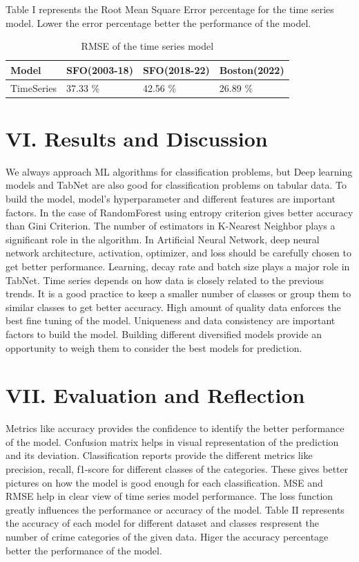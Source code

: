 \documentclass[10 pt,conference,final,]{IEEEtran}
\begin{document}
Table I represents the Root Mean Square Error percentage for the time
series model. Lower the error percentage better the performance of the
model.

\begin{table}
\centering
\caption{\label{tab:unnamed-chunk-16}RMSE of the time series model}
\centering
\begin{tabular}[t]{l|l|l|l}
\hline
Model & SFO(2003-18) & SFO(2018-22) & Boston(2022)\\
\hline
TimeSeries & 37.33 \% & 42.56 \% & 26.89 \%\\
\hline
\end{tabular}
\end{table}

\section{VI. Results and Discussion}\label{vi.-results-and-discussion}

We always approach ML algorithms for classification problems, but Deep
learning models and TabNet are also good for classification problems on
tabular data. To build the model, model's hyperparameter and different
features are important factors. In the case of RandomForest using
entropy criterion gives better accuracy than Gini Criterion. The number
of estimators in K-Nearest Neighbor plays a significant role in the
algorithm. In Artificial Neural Network, deep neural network
architecture, activation, optimizer, and loss should be carefully chosen
to get better performance. Learning, decay rate and batch size plays a
major role in TabNet. Time series depends on how data is closely related
to the previous trends. It is a good practice to keep a smaller number
of classes or group them to similar classes to get better accuracy. High
amount of quality data enforces the best fine tuning of the model.
Uniqueness and data consistency are important factors to build the
model. Building different diversified models provide an opportunity to
weigh them to consider the best models for prediction.

\section{VII. Evaluation and
Reflection}\label{vii.-evaluation-and-reflection}

Metrics like accuracy provides the confidence to identify the better
performance of the model. Confusion matrix helps in visual
representation of the prediction and its deviation. Classification
reports provide the different metrics like precision, recall, f1-score
for different classes of the categories. These gives better pictures on
how the model is good enough for each classification. MSE and RMSE help
in clear view of time series model performance. The loss function
greatly influences the performance or accuracy of the model. Table II
represents the accuracy of each model for different dataset and classes
respresent the number of crime categories of the given data. Higer the
accuracy percentage better the performance of the model.
\end{document}
